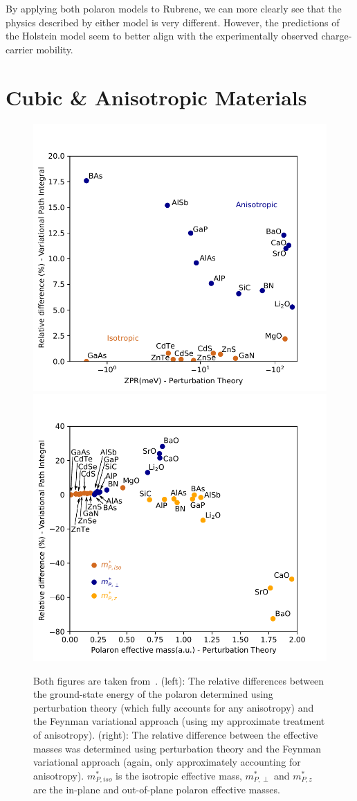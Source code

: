 By applying both polaron models to Rubrene, we can more clearly see that the physics described by either model is very different. However, the predictions of the Holstein model seem to better align with the experimentally observed charge-carrier mobility.

\section{Cubic \& Anisotropic Materials}
\label{sec:chap-sixth-third}

\begin{figure}[t]
    \centering
    \includegraphics[width=.49\textwidth]{figures/ff_zpr.pdf}
    \includegraphics[width=.49\textwidth]{figures/ff_emass.pdf}
    
    \caption{Both figures are taken from~\cite{guster_frohlich_2021}. (left): The relative differences between the ground-state energy of the polaron determined using perturbation theory (which fully accounts for any anisotropy) and the Feynman variational approach (using my approximate treatment of anisotropy). (right): The relative difference between the effective masses was determined using perturbation theory and the Feynman variational approach (again, only approximately accounting for anisotropy). $m^*_{P, iso}$ is the isotropic effective mass, $m^*_{P, \perp}$ and $m^*_{P, z}$ are the in-plane and out-of-plane polaron effective masses.}
    \label{fig:anisotropy}
\end{figure}

